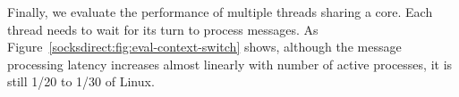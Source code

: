 

Finally, we evaluate the performance of multiple threads sharing a core. Each thread needs to wait for its turn to process messages.
As Figure~\ref{socksdirect:fig:eval-context-switch} shows, although the message processing latency increases almost linearly with number of active processes, it is still 1/20 to 1/30 of Linux.



